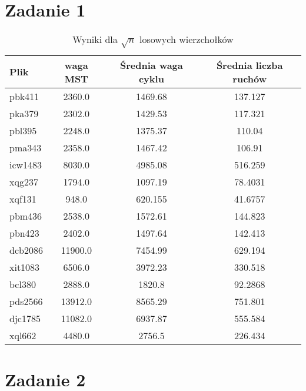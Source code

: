 \documentclass{article}
\begin{document}

\section*{Zadanie 1}

\begin{table}[ht]
    \centering
    \begin{tabular}{|l|c|c|c|}
    \hline
    \textbf{Plik} & \textbf{waga MST} & \textbf{Średnia waga cyklu} & \textbf{Średnia liczba ruchów} \\
    \hline
    pbk411 & 2360.0 & 1469.68 & 137.127 \\
    pka379 & 2302.0 & 1429.53 & 117.321 \\
    pbl395 & 2248.0 & 1375.37 & 110.04 \\
    pma343 & 2358.0 & 1467.42 & 106.91 \\
    icw1483 & 8030.0 & 4985.08 & 516.259 \\
    xqg237 & 1794.0 & 1097.19 & 78.4031 \\
    xqf131 & 948.0 & 620.155 & 41.6757 \\
    pbm436 & 2538.0 & 1572.61 & 144.823 \\
    pbn423 & 2402.0 & 1497.64 & 142.413 \\
    dcb2086 & 11900.0 & 7454.99 & 629.194 \\
    xit1083 & 6506.0 & 3972.23 & 330.518 \\
    bcl380 & 2888.0 & 1820.8 & 92.2868 \\
    pds2566 & 13912.0 & 8565.29 & 751.801 \\
    djc1785 & 11082.0 & 6937.87 & 555.584 \\
    xql662 & 4480.0 & 2756.5 & 226.434 \\
    \hline
    \end{tabular}
    \caption{Wyniki dla $\sqrt{n}$ losowych wierzchołków}
    \end{table}
    

\section*{Zadanie 2}
\end{document}
